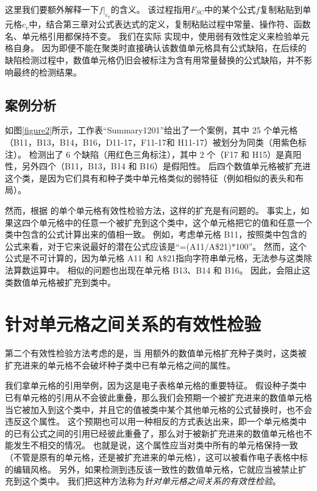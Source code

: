 这里我们要额外解释一下$f|_{c_v}$的含义。
该过程指用$F_{SC}$中的某个公式$f$复制粘贴到单元格$c_v$中，结合第三章对公式表达式的定义，复制粘贴过程中常量、操作符、函数名、单元格引用都保持不变。
我们在实际 \wa 实现中，使用弱有效性定义来检验单元格自身。
因为即便不能在聚类时直接确认该数值单元格具有公式缺陷，在后续的缺陷检测过程中，数值单元格仍旧会被标注为含有用常量替换的公式缺陷，并不影响最终的检测结果。

\subsection{案例分析}
如图\ref{figure2}所示，工作表“Summary1201”给出了一个案例，其中 25 个单元格（B11，B13，B14，B16，D11-17，F11-17和 H11-17）被\cu 划分为同类（用紫色标注）。
\cu 检测出了 6 个缺陷（用红色三角标注），其中 2 个（F17 和 H15）是真阳性，另外四个（B11，B13，B14 和 B16）是假阳性。
后四个数值单元格被扩充进这个类，是因为它们具有和种子类中单元格类似的弱特征（例如相似的表头和布局）。

然而，根据 \wa 的单个单元格有效性检验方法，这样的扩充是有问题的。
事实上，如果这四个单元格中的任意一个被扩充到这个类中，这个单元格把它的值和任意一个类中包含的公式计算出来的值相一致。
例如，考虑单元格 B11，按照类中包含的公式来看，对于它来说最好的潜在公式应该是“=(A11$/$A\$21)$*$100”。
然而，这个公式是不可计算的，因为单元格 A11 和 A\$21指向字符串单元格，无法参与这类除法算数运算中。
相似的问题也出现在单元格 B13、B14 和 B16。 
因此，\wa 会阻止这类数值单元格被扩充到类中。


\section{针对单元格之间关系的有效性检验}
第二个有效性检验方法考虑的是，当 \wa 用额外的数值单元格扩充种子类时，这类被扩充进来的单元格不会破坏种子类中已有单元格之间的属性。

我们拿单元格的引用举例，因为这是电子表格单元格的重要特征。
假设种子类中已有单元格的引用从不会彼此重叠，那么我们会预期一个被扩充进来的数值单元格当它被加入到这个类中，并且它的值被类中某个其他单元格的公式替换时，也不会违反这个属性。
这个预期也可以用一种相反的方式表达出来，即一个单元格类中的已有公式之间的引用已经彼此重叠了，那么对于被新扩充进来的数值单元格也不能发生不相交的情况。
也就是说，这个属性应当对类中所有的单元格保持一致（不管是原有的单元格，还是被扩充进来的单元格），这可以被看作电子表格中标的编辑风格。
另外，如果检测到违反该一致性的数值单元格，它就应当被禁止扩充到这个类中。
我们把这种方法称为\textit{针对单元格之间关系的有效性检验}。

